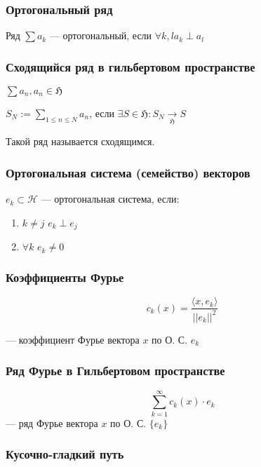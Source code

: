 \documentclass{article}
\def\dbl{\,\,}
\def\goesto#1{\underset{#1}{\longrightarrow}}
\begin{document}
\subsubsection{Ортогональный ряд}

Ряд $\sum a_k$ --- ортогональный, если $\forall k, l a_k \perp a_l$

\subsubsection{Сходящийся ряд в гильбертовом пространстве}

$\sum a_n, a_n \in \mathfrak{H}$

$S_N := \sum_{1 \le n \le N} a_n$, если $\exists S \in \mathfrak{H}: S_N \goesto{\mathfrak{H}} S$

Такой ряд называется сходящимся.

\subsubsection{Ортогональная система (семейство) векторов}

${e_k} \subset \mathcal{H}$ --- ортогональная система, если:

\begin{enumerate}
    \item $k \neq j \dbl e_k \perp e_j$
    \item $\forall k \dbl e_k \neq 0$
\end{enumerate}

\subsubsection{Коэффициенты Фурье}

\[c_k(x) = \frac{\langle x, e_k \rangle}{||e_k||^2}\]

--- коэффициент Фурье вектора $x$ по О. С. $e_k$

\subsubsection{Ряд Фурье в Гильбертовом пространстве}

\[\sum_{k = 1}^{\infty} c_k(x) \cdot e_k\]
--- ряд Фурье вектора $x$ по О. С. $\{e_k\}$

\subsubsection{Кусочно-гладкий путь}
\end{document}
